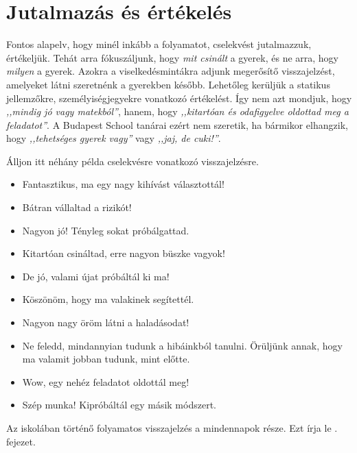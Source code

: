 \section{Jutalmazás és értékelés}
\label{sec:jutalmazas_es_ertekeles}

Fontos alapelv, hogy minél inkább a folyamatot, cselekvést jutalmazzuk, értékeljük. Tehát arra fókuszáljunk, hogy \emph{mit csinált} a gyerek, és ne arra, hogy \emph{milyen} a gyerek. Azokra a viselkedésmintákra adjunk megerősítő visszajelzést, amelyeket látni szeretnénk a gyerekben később.  Lehetőleg kerüljük a statikus jellemzőkre, személyiségjegyekre vonatkozó értékelést. Így nem azt mondjuk, hogy \emph{,,mindig jó vagy matekból''}, hanem, hogy \emph{,,kitartóan és odafigyelve oldottad meg a feladatot''}. A Budapest School tanárai ezért nem szeretik, ha bármikor elhangzik, hogy \emph{,,tehetséges gyerek vagy''} vagy \emph{,,jaj, de cuki!''}.

Álljon itt néhány példa cselekvésre vonatkozó visszajelzésre.

\begin{itemize}

      \item
            Fantasztikus, ma egy nagy kihívást választottál!
      \item
            Bátran vállaltad a rizikót!
      \item
            Nagyon jó! Tényleg sokat próbálgattad.
      \item
            Kitartóan csináltad, erre nagyon büszke vagyok!
      \item
            De jó, valami újat próbáltál ki ma!
      \item
            Köszönöm, hogy ma valakinek segítettél.
      \item
            Nagyon nagy öröm látni a haladásodat!
      \item
            Ne feledd, mindannyian tudunk a hibáinkból tanulni. Örüljünk annak, hogy ma valamit jobban tudunk, mint előtte.
      \item
            Wow, egy nehéz feladatot oldottál meg!
      \item
            Szép munka! Kipróbáltál egy másik módszert.
\end{itemize}

Az iskolában történő folyamatos visszajelzés a mindennapok része. Ezt írja le . fejezet.

